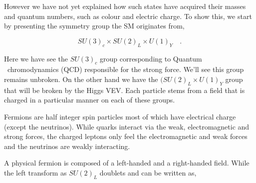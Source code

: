 However we have not yet explained how such states have acquired their masses and quantum numbers, such as colour and electric charge. To show this, we start by presenting the symmetry group the SM originates from,

\begin{equation}
SU(3)_c \times SU(2)_L \times U(1)_Y \quad  .
\label{eq:SM Group}
\end{equation} 

Here we have see the $SU(3)_c$ group corresponding to Quantum ~chromodynamics (QCD) responsible for the strong force. We'll see this group remains unbroken. On the other hand we have the $(SU(2)_L \times U(1)_Y$ group that will be broken by the Higgs VEV. Each particle stems from a field that is charged in a particular manner on each of these groups.  

Fermions are half integer spin particles most of which have electrical charge (except the neutrinos).  While quarks interact via the weak, electromagnetic and strong forces, the charged leptons only feel the electromagnetic and weak forces and the neutrinos are weakly interacting.  

A physical fermion is composed of a left-handed and a right-handed field. While the left transform as $SU(2)_L$ doublets and can be written as,

